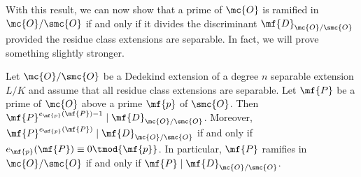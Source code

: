\documentclass[12pt]{article}
\begin{document}
      With this result, we can now show that a prime of \(\mc{O}\) is ramified in \(\mc{O}/\smc{O}\) if and only if it divides the discriminant \(\mf{D}_{\mc{O}/\smc{O}}\) provided the residue class extensions are separable. In fact, we will prove something slightly stronger.

      \begin{theorem}\label{thm:ramifies_if_and_only_if_divides_the_different}
        Let \(\mc{O}/\smc{O}\) be a Dedekind extension of a degree \(n\) separable extension \(L/K\) and assume that all residue class extensions are separable. Let \(\mf{P}\) be a prime of \(\mc{O}\) above a prime \(\mf{p}\) of \(\smc{O}\). Then \(\mf{P}^{e_{\mf{p}}(\mf{P})-1} \mid \mf{D}_{\mc{O}/\smc{O}}\). Moreover, \(\mf{P}^{e_{\mf{p}}(\mf{P})} \mid \mf{D}_{\mc{O}/\smc{O}}\) if and only if \(e_{\mf{p}}(\mf{P}) \equiv 0 \tmod{\mf{p}}\). In particular, \(\mf{P}\) ramifies in \(\mc{O}/\smc{O}\) if and only if \(\mf{P} \mid \mf{D}_{\mc{O}/\smc{O}}\).
      \end{theorem}
\end{document}
